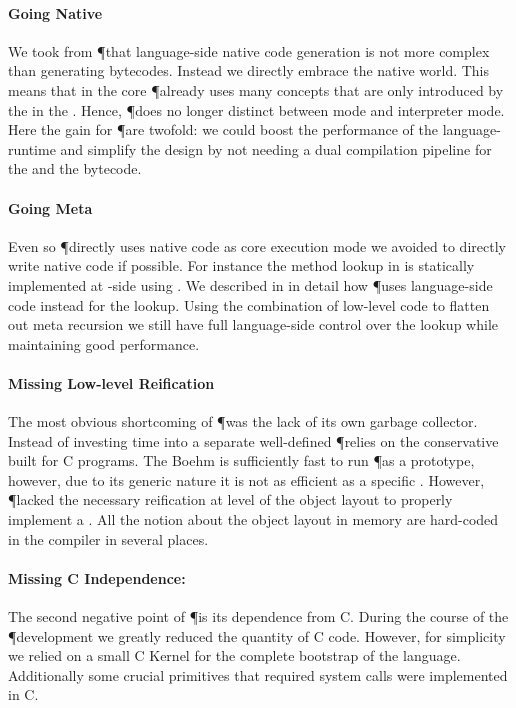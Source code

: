\paragraph{Going Native}
We took from \P that language-side native code generation is not more complex than generating bytecodes.
Instead we directly embrace the native world.
This means that in the core \P already uses many concepts that are only introduced by the \JIT in the \Cog \VM.
Hence, \P does no longer distinct between \JIT mode and interpreter mode.
Here the gain for \P are twofold: we could boost the performance of the language-runtime and simplify the design by not needing a dual compilation pipeline for the \JIT and the bytecode.

\paragraph{Going Meta}
Even so \P directly uses native code as core execution mode we avoided to directly write native code if possible.
For instance the method lookup in \Cog is statically implemented at \VM-side using \Slang.
We described in  in detail how \P uses language-side code instead for the lookup.
Using the combination of low-level code to flatten out meta recursion we still have full language-side control over the lookup while maintaining good performance.

\paragraph{Missing Low-level Reification}
The most obvious shortcoming of \P was the lack of its own garbage collector.
Instead of investing time into a separate well-defined \GC \P relies on the conservative  built for C programs.
The Boehm \GC is sufficiently fast to run \P as a prototype, however, due to its generic nature it is not as efficient as a specific \GC.
However, \P lacked the necessary reification at level of the object layout to properly implement a \GC.
All the notion about the object layout in memory are hard-coded in the compiler in several places.

\paragraph{Missing C Independence:}
The second negative point of \P is its dependence from C.
During the course of the \P development we greatly reduced the quantity of C code.
However, for simplicity we relied on a small C Kernel for the complete bootstrap of the language.
Additionally some crucial primitives that required system calls were implemented in C.

